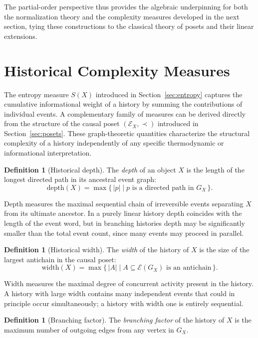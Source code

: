 \documentclass[12pt]{article}
\theoremstyle{plain}
\theoremstyle{definition}
\newtheorem{definition}[theorem]{Definition}
\theoremstyle{remark}
\begin{document}
The partial-order perspective thus provides the algebraic underpinning for both
the normalization theory and the complexity measures developed in the next
section, tying these constructions to the classical theory of posets and their
linear extensions.


\section{Historical Complexity Measures}
\label{sec:complexity}

The entropy measure $S(X)$ introduced in Section~\ref{sec:entropy} captures
the cumulative informational weight of a history by summing the contributions
of individual events.  A complementary family of measures can be derived
directly from the structure of the causal poset $(\mathcal{E}_X, \prec)$
introduced in Section~\ref{sec:posets}.  These graph-theoretic quantities
characterize the structural complexity of a history independently of any
specific thermodynamic or informational interpretation.

\begin{definition}[Historical depth]
The \emph{depth} of an object $X$ is the length of the longest directed path
in its ancestral event graph:
\[
  \mathrm{depth}(X) = \max\{\,|p| \mid p \text{ is a directed path in } G_X\,\}.
\]
\end{definition}

Depth measures the maximal sequential chain of irreversible events separating
$X$ from its ultimate ancestor.  In a purely linear history depth coincides
with the length of the event word, but in branching histories depth may be
significantly smaller than the total event count, since many events may proceed
in parallel.

\begin{definition}[Historical width]
The \emph{width} of the history of $X$ is the size of the largest antichain in
the causal poset:
\[
  \mathrm{width}(X) = \max\{\,|A| \mid A \subseteq \mathcal{E}(G_X)
  \text{ is an antichain}\,\}.
\]
\end{definition}

Width measures the maximal degree of concurrent activity present in the
history.  A history with large width contains many independent events that
could in principle occur simultaneously; a history with width one is entirely
sequential.

\begin{definition}[Branching factor]
The \emph{branching factor} of the history of $X$ is the maximum number of
outgoing edges from any vertex in $G_X$.
\end{definition}
\end{document}
